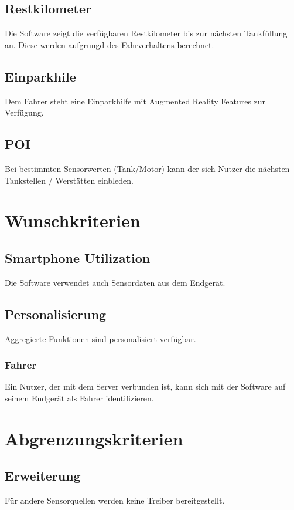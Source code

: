 \documentclass[pflichtenheft.tex]{subfiles}
\begin{document}
\subsection{\mknr Restkilometer} Die Software zeigt die verfügbaren Restkilometer bis zur nächsten Tankfüllung an. Diese werden aufgrungd des Fahrverhaltens berechnet.

\subsection{\mknr Einparkhile} Dem Fahrer steht eine Einparkhilfe mit Augmented Reality Features zur Verfügung.

\subsection{\mknr POI} Bei bestimmten Sensorwerten (Tank/Motor) kann der sich Nutzer die nächsten Tankstellen / Werstätten einbleden.


\section{Wunschkriterien}


\subsection{\mknr Smartphone Utilization} Die Software verwendet auch Sensordaten aus dem Endgerät.

\subsection{\mknr Personalisierung} Aggregierte Funktionen sind personalisiert verfügbar.

\subsubsection{\mknr Fahrer} Ein Nutzer, der mit dem Server verbunden ist, kann sich mit der Software auf seinem Endgerät als Fahrer identifizieren.

\section{Abgrenzungskriterien}

\subsection{\mknr Erweiterung} Für andere Sensorquellen werden keine Treiber bereitgestellt.
\end{document}
